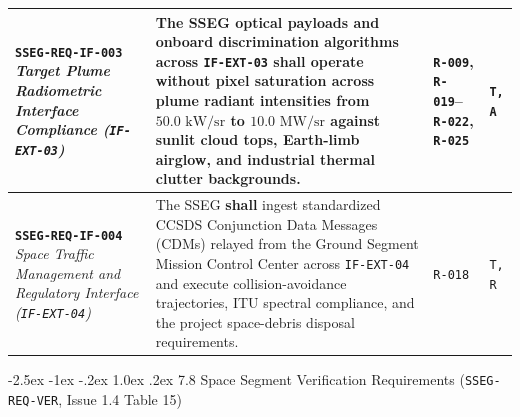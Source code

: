\documentclass[11pt,a4paper]{article}
\makeatletter
\renewcommand\subsection{\@startsection{subsection}{2}{\z@}%
    {-2.5ex \@plus -1ex \@minus -.2ex}%
    {1.0ex \@plus .2ex}%
    {\normalfont\large\bfseries\sffamily\color{SubHeadingBlue}}}
\providecommand{\abbr}[1]{#1}
\makeatother
\begin{document}
{\begin{longtable}{|>{\raggedright\arraybackslash}p{}|>{\raggedright\arraybackslash}p{}|>{\raggedright\arraybackslash}p{}|>{\raggedright\arraybackslash}p{}|}
\textbf{\texttt{SSEG-REQ-IF-003}} \newline \emph{Target Plume Radiometric Interface Compliance (\texttt{IF-EXT-03})} & The \abbr{SSEG} optical payloads and onboard discrimination algorithms across \texttt{IF-EXT-03} \textbf{shall} operate without pixel saturation across plume radiant intensities from $50.0\text{ kW/sr}$ to $10.0\text{ MW/sr}$ against sunlit cloud tops, Earth-limb airglow, and industrial thermal clutter backgrounds. & \texttt{R-009}, \texttt{R-019}--\texttt{R-022}, \texttt{R-025} & \texttt{T, A} \\ \hline
\textbf{\texttt{SSEG-REQ-IF-004}} \newline \emph{Space Traffic Management and Regulatory Interface (\texttt{IF-EXT-04})} & The \abbr{SSEG} \textbf{shall} ingest standardized CCSDS Conjunction Data Messages (\abbr{CDM}s) relayed from the Ground Segment Mission Control Center across \texttt{IF-EXT-04} and execute collision-avoidance trajectories, \abbr{ITU} spectral compliance, and the project space-debris disposal requirements. & \texttt{R-018} & \texttt{T, R} \\ \hline
\end{longtable}}

\subsection{7.8 Space Segment Verification Requirements (\texttt{SSEG-REQ-VER}, Issue 1.4 Table 15)}
\end{document}
